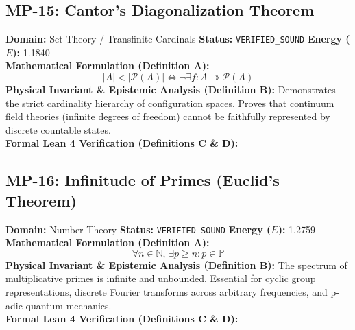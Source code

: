 \subsection{MP-15: Cantor's Diagonalization Theorem}
\textbf{Domain:} Set Theory / Transfinite Cardinals \hfill \textbf{Status:} \texttt{VERIFIED\_SOUND} \hfill \textbf{Energy ($E$):} 1.1840\\
\textbf{Mathematical Formulation (Definition A):}
\begin{equation*}
|A| < |\mathcal{P}(A)| \iff \neg \exists f: A \twoheadrightarrow \mathcal{P}(A)
\end{equation*}
\textbf{Physical Invariant \& Epistemic Analysis (Definition B):}
Demonstrates the strict cardinality hierarchy of configuration spaces. Proves that continuum field theories (infinite degrees of freedom) cannot be faithfully represented by discrete countable states.\\

\textbf{Formal Lean 4 Verification (Definitions C \& D):}


\vspace{1em}
\subsection{MP-16: Infinitude of Primes (Euclid's Theorem)}
\textbf{Domain:} Number Theory \hfill \textbf{Status:} \texttt{VERIFIED\_SOUND} \hfill \textbf{Energy ($E$):} 1.2759\\
\textbf{Mathematical Formulation (Definition A):}
\begin{equation*}
\forall n \in \mathbb{N}, \, \exists p \ge n: p \in \mathbb{P}
\end{equation*}
\textbf{Physical Invariant \& Epistemic Analysis (Definition B):}
The spectrum of multiplicative primes is infinite and unbounded. Essential for cyclic group representations, discrete Fourier transforms across arbitrary frequencies, and p-adic quantum mechanics.\\

\textbf{Formal Lean 4 Verification (Definitions C \& D):}


\vspace{1em}
